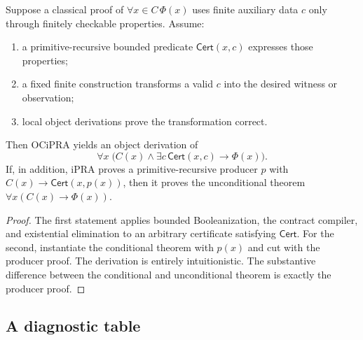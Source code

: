 \begin{theorem}\label{thm:pvd}
Suppose a classical proof of $\forall x\in C\,\Phi(x)$ uses finite auxiliary data $c$ only through finitely checkable properties.  Assume:

\begin{enumerate}
  \item a primitive-recursive bounded predicate $\mathsf{Cert}(x,c)$ expresses those properties;
  \item a fixed finite construction transforms a valid $c$ into the desired witness or observation;
  \item local object derivations prove the transformation correct.
\end{enumerate}

Then OCiPRA yields an object derivation of
\[
  \forall x\;\bigl(C(x)\wedge\exists c\,\mathsf{Cert}(x,c)\to\Phi(x)\bigr).
\]
If, in addition, iPRA proves a primitive-recursive producer $p$ with
$C(x)\to\mathsf{Cert}(x,p(x))$, then it proves the unconditional theorem
$\forall x(C(x)\to\Phi(x))$.
\end{theorem}

\begin{proof}
The first statement applies bounded Booleanization, the contract compiler, and existential elimination to an arbitrary certificate satisfying $\mathsf{Cert}$.  For the second, instantiate the conditional theorem with $p(x)$ and cut with the producer proof.  The derivation is entirely intuitionistic.  The substantive difference between the conditional and unconditional theorem is exactly the producer proof.
\end{proof}

\subsection{A diagnostic table}


